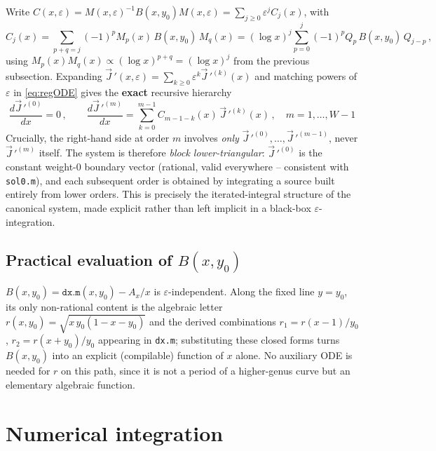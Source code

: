 \documentclass[11pt]{article}
\newcommand{\eps}{\varepsilon}
\newcommand{\Jreg}{\vec J\,'}
\begin{document}
Write $C(x,\eps)=M(x,\eps)^{-1}B(x,y_0)M(x,\eps)=\sum_{j\ge0}\eps^j C_j(x)$, with
\begin{equation}
C_j(x) = \sum_{p+q=j} (-1)^p M_p(x)\,B(x,y_0)\,M_q(x)
= (\log x)^j \sum_{p=0}^{j} (-1)^p Q_p\,B(x,y_0)\,Q_{j-p}\,,
\end{equation}
using $M_p(x)M_q(x)\propto(\log x)^{p+q}=(\log x)^j$ from the previous subsection. Expanding
$\Jreg(x,\eps)=\sum_{k\ge0}\eps^k \Jreg^{(k)}(x)$ and matching powers of $\eps$ in
\eqref{eq:regODE} gives the \textbf{exact} recursive hierarchy
\begin{equation}
\boxed{\ \frac{d\Jreg^{(0)}}{dx}=0\,,\qquad
\frac{d\Jreg^{(m)}}{dx} = \sum_{k=0}^{m-1} C_{m-1-k}(x)\,\Jreg^{(k)}(x)\,,\quad m=1,\dots,W-1\ }
\label{eq:hierarchy}
\end{equation}
Crucially, the right-hand side at order $m$ involves \emph{only} $\Jreg^{(0)},\ldots,\Jreg^{(m-1)}$,
never $\Jreg^{(m)}$ itself. The system is therefore \emph{block lower-triangular}: $\Jreg^{(0)}$ is
the constant weight-0 boundary vector (rational, valid everywhere -- consistent with
\texttt{sol0.m}), and each subsequent order is obtained by integrating a source built entirely from
lower orders. This is precisely the iterated-integral structure of the canonical system, made
explicit rather than left implicit in a black-box $\eps$-integration.

\subsection{Practical evaluation of $B(x,y_0)$}

$B(x,y_0)=\texttt{dx.m}(x,y_0)-A_x/x$ is $\eps$-independent. Along the fixed line $y=y_0$, its only
non-rational content is the algebraic letter $r(x,y_0)=\sqrt{x\,y_0(1-x-y_0)}$ and the derived
combinations $r_1=r(x-1)/y_0$, $r_2=r(x+y_0)/y_0$ appearing in \texttt{dx.m}; substituting these
closed forms turns $B(x,y_0)$ into an explicit (compilable) function of $x$ alone. No auxiliary ODE
is needed for $r$ on this path, since it is not a period of a higher-genus curve but an elementary
algebraic function.

\section{Numerical integration}
\end{document}
